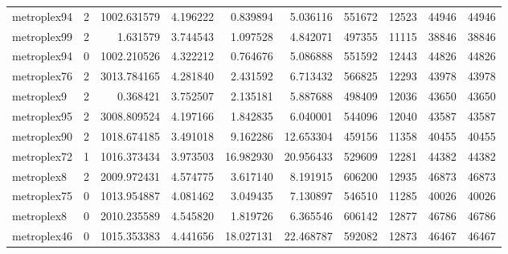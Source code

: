 \documentclass[../../../thesis.tex]{subfiles}
\begin{document}
\begin{longtable}{|l|r|r|r|r|r|r|r|r|r|}
metroplex94 & 2 & 1002.631579 & 4.196222 & 0.839894 & 5.036116 & 551672 & 12523 & 44946 & 44946 \\
metroplex99 & 2 & 1.631579 & 3.744543 & 1.097528 & 4.842071 & 497355 & 11115 & 38846 & 38846 \\
metroplex94 & 0 & 1002.210526 & 4.322212 & 0.764676 & 5.086888 & 551592 & 12443 & 44826 & 44826 \\
metroplex76 & 2 & 3013.784165 & 4.281840 & 2.431592 & 6.713432 & 566825 & 12293 & 43978 & 43978 \\
metroplex9 & 2 & 0.368421 & 3.752507 & 2.135181 & 5.887688 & 498409 & 12036 & 43650 & 43650 \\
metroplex95 & 2 & 3008.809524 & 4.197166 & 1.842835 & 6.040001 & 544096 & 12040 & 43587 & 43587 \\
metroplex90 & 2 & 1018.674185 & 3.491018 & 9.162286 & 12.653304 & 459156 & 11358 & 40455 & 40455 \\
metroplex72 & 1 & 1016.373434 & 3.973503 & 16.982930 & 20.956433 & 529609 & 12281 & 44382 & 44382 \\
metroplex8 & 2 & 2009.972431 & 4.574775 & 3.617140 & 8.191915 & 606200 & 12935 & 46873 & 46873 \\
metroplex75 & 0 & 1013.954887 & 4.081462 & 3.049435 & 7.130897 & 546510 & 11285 & 40026 & 40026 \\
metroplex8 & 0 & 2010.235589 & 4.545820 & 1.819726 & 6.365546 & 606142 & 12877 & 46786 & 46786 \\
metroplex46 & 0 & 1015.353383 & 4.441656 & 18.027131 & 22.468787 & 592082 & 12873 & 46467 & 46467 \\
\end{longtable}
\end{document}
